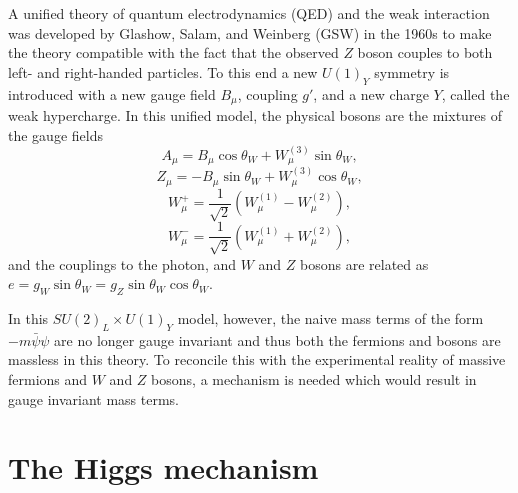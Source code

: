 A unified theory of quantum electrodynamics (QED) and the weak interaction was developed
by Glashow, Salam, and Weinberg (GSW) in the 1960s \cite{Thomson:2013zua} to make the
theory compatible with the fact that the observed $Z$ boson couples to both left- and
right-handed particles. To this end a new $U(1)_Y$ symmetry is introduced with a new gauge
field $B_\mu$, coupling $g'$, and a new charge $Y$, called the weak hypercharge. In this unified model,
the physical bosons are the mixtures of the gauge fields
\begin{equation}
A_\mu = B_\mu \cos\theta_W + W_\mu^{(3)} \sin{\theta_W},
\end{equation}
\begin{equation}
Z_\mu = - B_\mu \sin{\theta_W} + W_\mu^{(3)} \cos{\theta_W},
\end{equation}
\begin{equation}
W^+_\mu = \frac{1}{\sqrt{2}}\left( W_\mu^{(1)} - W_\mu^{(2)} \right),
\end{equation}
\begin{equation}
W^-_\mu = \frac{1}{\sqrt{2}}\left( W_\mu^{(1)} + W_\mu^{(2)} \right),
\end{equation}
and the couplings to the photon, and $W$ and $Z$ bosons are related as
$e = g_W \sin{\theta_W}  = g_Z \sin{\theta_W} \cos{\theta_W}$.

In this $SU(2)_L \times U(1)_Y$ model, however, the naive mass terms of the form $-m\bar\psi\psi$
are no longer gauge invariant and thus both the fermions and bosons are massless in this theory.
To reconcile this with the experimental reality of massive fermions and $W$ and $Z$ bosons, a
mechanism is needed which would result in gauge invariant mass terms.

\section{The Higgs mechanism}

